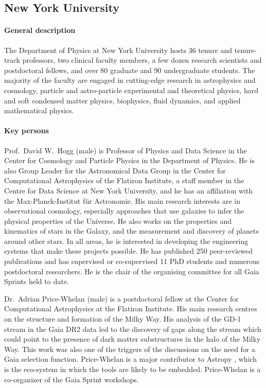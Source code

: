 \subsection{New York University}
\label{sec:nyu}

\paragraph{General description}

The Department of Physics at New York University hosts 36 tenure and tenure-track professors, two clinical faculty members, a few dozen research scientists and postdoctoral fellows, and over 80 graduate and 90 undergraduate students. The majority of the faculty are engaged in cutting-edge research in astrophysics and cosmology, particle and astro-particle experimental and theoretical physics, hard and soft condensed matter physics, biophysics, fluid dynamics, and applied mathematical physics.

\paragraph{Key persons}
Prof.~David W.~Hogg (male) is Professor of Physics and Data Science in the Center for Cosmology and Particle Physics in the Department of Physics. He is also Group Leader for the Astronomical Data Group in the Center for Computational Astrophysics of the Flatiron Institute, a staff member in the Centre for Data Science at New York University, and he has an affiliation with the Max-Planck-Institut für Astronomie. His main research interests are in observational cosmology, especially approaches that use galaxies to infer the physical properties of the Universe. He also works on the properties and kinematics of stars in the Galaxy, and the measurement and discovery of planets around other stars. In all areas, he is interested in developing the engineering systems that make these projects possible. He has published 250 peer-reviewed publications and has supervised or co-supervised 11 PhD students and numerous postdoctoral researchers. He is the chair of the organising committee for all Gaia Sprints held to date.

Dr.~Adrian Price-Whelan (male) is a postdoctoral fellow at the Center for Computational Astrophysics at the Flatiron Institute. His main research centres on the structure and formation of the Milky Way. His analysis of the GD-1 stream in the Gaia DR2 data led to the discovery of gaps along the stream which could point to the presence of dark matter substructures in the halo of the Milky Way\cite{2018ApJ...863L..20P,2019ApJ...880...38B}. This work was also one of the triggers of the discussions on the need for a Gaia selection function. Price-Whelan is a major contributor to Astropy \cite{astropy2018}, which is the eco-system in which the {\acro} tools are likely to be embedded. Price-Whelan is a co-organizer of the Gaia Sprint workshops.

